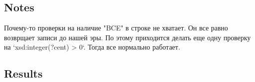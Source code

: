 \documentclass{article}
\begin{document}
\subsection*{Notes}
Почему-то проверки на наличие "BCE" в строке не хватает. Он все равно возврщает записи до нашей эры. По этому приходится делать еще одну проверку на `xsd:integer(?cent) > 0`. Тогда все нормально работает.

\subsection*{Results}

\noindent{}
\end{document}
